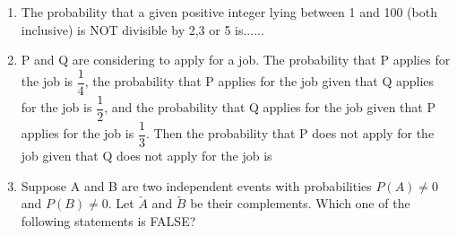\renewcommand{\theequation}{\theenumi}
\renewcommand{\thefigure}{\theenumi}
\renewcommand{\thetable}{\theenumi}
\begin{enumerate}[label=\thesection.\arabic*.,ref=\thesection.\theenumi]

\item The probability that a given positive integer lying between 1 and 100 (both inclusive) is NOT divisible by 2,3 or 5 is......
\\
\solution


\item P and Q are considering to apply for a job. The probability that P applies for the job is $\dfrac{1}{4}$, the probability that P applies for the job given that Q applies for the job is $\dfrac{1}{2}$, and the probability that Q applies for the job given that P applies for the job is $\dfrac{1}{3}$. Then the probability that P does not apply for the job given that Q does not apply for the job is 

\begin{enumerate}
\end{enumerate}
\solution

%
\item Suppose A and B are two independent events with probabilities $P(A)\neq 0$ and $P(B)\neq0$. Let $\widetilde A$ and $\widetilde B$ be their complements. Which one of the following statements is FALSE?

\begin{enumerate}
\end{enumerate}
\solution



\end{enumerate}
